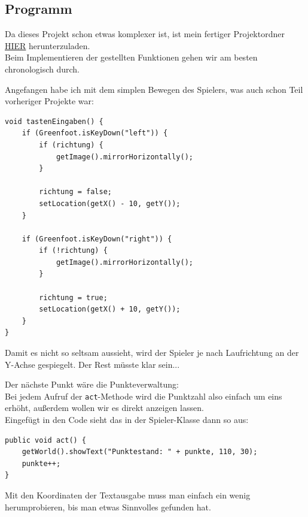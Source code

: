 \documentclass{scrartcl}   %
\begin{document}
\subsection{Programm}

Da dieses Projekt schon etwas komplexer ist, ist mein fertiger Projektordner \href{https://github.com/cyb3rko/inf-schule-loesungen/raw/master/2/2.3/2.3.2/2.3.2.4\%20Space\%20Invaders/2.Entwicklung_des_Spiels/Space\%20Invaders.zip}{HIER} herunterzuladen.\\
Beim Implementieren der gestellten Funktionen gehen wir am besten chronologisch durch.

Angefangen habe ich mit dem simplen Bewegen des Spielers, was auch schon Teil vorheriger Projekte war:\\
\begin{lstlisting}
void tastenEingaben() {
    if (Greenfoot.isKeyDown("left")) {
        if (richtung) {
            getImage().mirrorHorizontally();
        }

        richtung = false;
        setLocation(getX() - 10, getY());
    }

    if (Greenfoot.isKeyDown("right")) {
        if (!richtung) {
            getImage().mirrorHorizontally();
        }

        richtung = true;
        setLocation(getX() + 10, getY());
    }
}
\end{lstlisting}

Damit es nicht so seltsam aussieht, wird der Spieler je nach Laufrichtung an der Y-Achse gespiegelt. Der Rest müsste klar sein...

Der nächste Punkt wäre die Punkteverwaltung:\\
Bei jedem Aufruf der \texttt{act}-Methode wird die Punktzahl also einfach um eins erhöht, außerdem wollen wir es direkt anzeigen lassen.\\
Eingefügt in den Code sieht das in der Spieler-Klasse dann so aus:

\newpage

\begin{lstlisting}
public void act() {
    getWorld().showText("Punktestand: " + punkte, 110, 30);
    punkte++;
}
\end{lstlisting}

Mit den Koordinaten der Textausgabe muss man einfach ein wenig herumprobieren, bis man etwas Sinnvolles gefunden hat.
\end{document}
